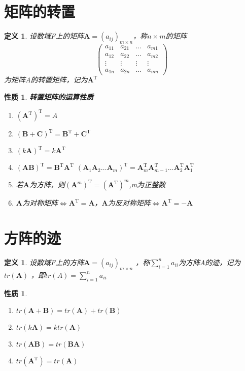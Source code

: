 \documentclass[12pt,oneside]{ctexbook}
\newtheorem{definition}[subsection]{定义}
\newtheorem{property}[subsection]{性质}
\begin{document}
\section{矩阵的转置}
\begin{definition}
    设数域F上的矩阵\(\mathbf{A}=(a_{ij})_{m\times n}\)，称\(n\times m\)的矩阵
    \[\begin{pmatrix}
        a_{11}&a_{21}&\dots&a_{m1}
        \\a_{12}&a_{22}&\dots&a_{m2}
        \\ \vdots &\vdots &\vdots &\vdots
        \\a_{1n}&a_{2n}&\dots&a_{mn}
    \end{pmatrix}\]
    为矩阵A的转置矩阵，记为\(\mathbf{A}^\mathrm{T}\)
\end{definition}
\begin{property}
    \textbf{转置矩阵的运算性质}\\
    \begin{enumerate}
        \item \((\mathbf{A}^\mathrm{T})^\mathrm{T}=A\)
        \item \((\mathbf{B}+\mathbf{C})^\mathrm{T}=\mathbf{B}^\mathrm{T}+\mathbf{C}^\mathrm{T}\)
        \item \((k\mathbf{A})^\mathrm{T}=k\mathbf{A}^\mathrm{T}\)
        \item \((\mathbf{A}\mathbf{B})^\mathrm{T}=\mathbf{B}^\mathrm{T}\mathbf{A}^\mathrm{T}\)  \((\mathbf{A}_1\mathbf{A}_2\dots \mathbf{A}_m)^\mathrm{T}=\mathbf{A}_m^\mathrm{T}\mathbf{A}_{m-1}^\mathrm{T}\dots \mathbf{A}_2^\mathrm{T}\mathbf{A}_1^\mathrm{T}\)
        \item 若\(\mathbf{A}\)为方阵，则\((\mathbf{A}^m)^\mathrm{T}=(\mathbf{A}^\mathrm{T})^m\),m为正整数
        \item \(\mathbf{A}\)为对称矩阵\(\Leftrightarrow \mathbf{A}^\mathrm{T}=\mathbf{A}\)，\(\mathbf{A}\)为反对称矩阵\(\Leftrightarrow \mathbf{A}^\mathrm{T}=-\mathbf{A}\)
    \end{enumerate}
\end{property}

\section{方阵的迹}
\begin{definition}
    设数域F上的方阵\(\mathbf{A}=(a_{ij})_{m\times n}\) ，称\(\sum\limits_{i=1}^n a_{ii}\)为方阵A的迹，记为\(tr(\mathbf{A})\) ，即\(tr(A)=\sum\limits_{i=1}^n a_{ii}\)
\end{definition}
\begin{property}
    \begin{enumerate}
        \item \(tr(\mathbf{A}+\mathbf{B})=tr(\mathbf{A})+tr(\mathbf{B})\)
        \item \(tr(k\mathbf{A})=ktr(\mathbf{A})\)
        \item \(tr(\mathbf{A}\mathbf{B})=tr(\mathbf{B}\mathbf{A})\)
        \item \(tr(\mathbf{A}^\mathrm{T})=tr(\mathbf{A})\)
    \end{enumerate}
\end{property}
\end{document}
